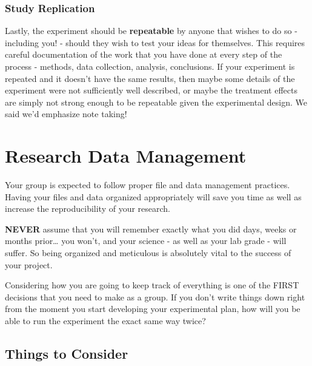 \documentclass[
]{book}
\begin{document}
\hypertarget{study-replication}{%
\subsubsection*{Study Replication}\label{study-replication}}

Lastly, the experiment should be \textbf{repeatable} by anyone that wishes to do so - including you! - should they wish to test your ideas for themselves. This requires careful documentation of the work that you have done at every step of the process - methods, data collection, analysis, conclusions. If your experiment is repeated and it doesn't have the same results, then maybe some details of the experiment were not sufficiently well described, or maybe the treatment effects are simply not strong enough to be repeatable given the experimental design. We said we'd emphasize note taking!

\hypertarget{research-data-management}{%
\section*{Research Data Management}\label{research-data-management}}

Your group is expected to follow proper file and data management practices. Having your files and data organized appropriately will save you time as well as increase the reproducibility of your research.

\textbf{NEVER} assume that you will remember exactly what you did days, weeks or months prior\ldots{} you won't, and your science - as well as your lab grade - will suffer. So being organized and meticulous is absolutely vital to the success of your project.

Considering how you are going to keep track of everything is one of the FIRST decisions that you need to make as a group. If you don't write things down right from the moment you start developing your experimental plan, how will you be able to run the experiment the exact same way twice?

\hypertarget{things-to-consider}{%
\subsection*{Things to Consider}\label{things-to-consider}}
\end{document}
